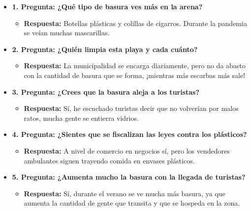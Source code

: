 \documentclass[12pt]{article}
\begin{document}
\begin{itemize}
    \item \textbf{1. Pregunta: ¿Qué tipo de basura ves más en la arena?}
    \begin{itemize}
        \item \textbf{Respuesta:} Botellas plásticas y colillas de cigarros. Durante la pandemia se veían muchas mascarillas.
    \end{itemize}

    \item \textbf{2. Pregunta: ¿Quién limpia esta playa y cada cuánto?}
    \begin{itemize}
        \item \textbf{Respuesta:} La municipalidad se encarga diariamente, pero no da abasto con la cantidad de basura que se forma, ¡mientras más escarbas más sale!
    \end{itemize}

    \item \textbf{3. Pregunta: ¿Crees que la basura aleja a los turistas?}
    \begin{itemize}
        \item \textbf{Respuesta:} Sí, he escuchado turistas decir que no volverían por malos ratos, mucha gente se entierra vidrios.
    \end{itemize}

    \item \textbf{4. Pregunta: ¿Sientes que se fiscalizan las leyes contra los plásticos?}
    \begin{itemize}
        \item \textbf{Respuesta:} A nivel de comercio en negocios sí, pero los vendedores ambulantes siguen trayendo comida en envases plásticos.
    \end{itemize}

    \item \textbf{5. Pregunta: ¿Aumenta mucho la basura con la llegada de turistas?}
    \begin{itemize}
        \item \textbf{Respuesta:} Sí, durante el verano se ve mucha más basura, ya que aumenta la cantidad de gente que transita y que se hospeda en la zona.
    \end{itemize}
\end{itemize}
\end{document}
